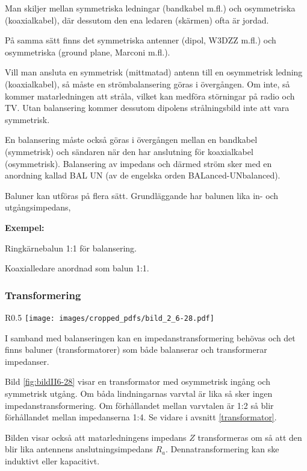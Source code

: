 Man skiljer mellan symmetriska ledningar (bandkabel m.fl.) och osymmetriska
(koaxialkabel), där dessutom den ena ledaren (skärmen) ofta är jordad.

På samma sätt finns det symmetriska antenner (dipol, W3DZZ m.fl.) och
osymmetriska (ground plane, Marconi m.fl.).

Vill man ansluta en symmetrisk (mittmatad) antenn till en osymmetrisk
ledning (koaxialkabel), så måste en strömbalansering göras i övergången.
Om inte, så kommer matarledningen att stråla, vilket kan
medföra störningar på radio och TV.
Utan balansering kommer dessutom dipolens strålningsbild inte att vara
symmetrisk.

En balansering måste också göras i övergången mellan en bandkabel (symmetrisk)
och sändaren när den har anslutning för koaxialkabel (osymmetrisk).
Balansering av impedans och därmed ström sker med en
anordning kallad BAL UN (av de engelska orden BALanced-UNbalanced).

Baluner kan utföras på flera sätt.
Grundläggande har balunen lika in- och utgångsimpedans,

\textbf{Exempel:}

Ringkärnebalun 1:1 för balansering.

Koaxialledare anordnad som balun 1:1.

\subsubsection{Transformering}

\begin{wrapfigure}[23]{R}{0.5\textwidth}
  \texttt{[image: images/cropped\_pdfs/bild\_2\_6-28.pdf]}
  \caption{Balansering -- transformering}
  \label{fig:bildII6-28}
\end{wrapfigure}

I samband med balanseringen kan en impedanstransformering behövas och det finns
baluner (transformatorer) som både balanserar och transformerar impedanser.

Bild \ref{fig:bildII6-28} visar en transformator med osymmetrisk ingång och
symmetrisk utgång.
Om båda lindningarnas varvtal är lika så sker ingen impedanstransformering.
Om förhållandet mellan varvtalen är 1:2 så blir förhållandet mellan
impedanserna 1:4. Se vidare i avsnitt \ref{transformator}.

Bilden visar också att matarledningens impedans \(Z\) transformeras om så
att den blir lika antennens anslutningsimpedans \(R_a\).
Dennatransformering kan ske induktivt eller kapacitivt.


